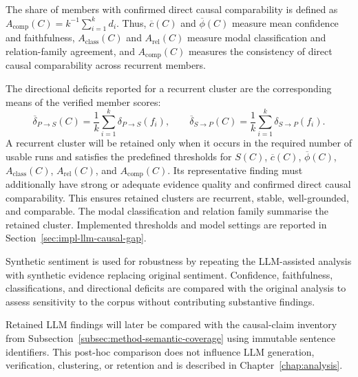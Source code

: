 The share of members with confirmed direct causal comparability is defined as
$A_{\mathrm{comp}}(C)=k^{-1}\sum_{i=1}^{k}d_i$. Thus, $\overline{c}(C)$ and
$\overline{\phi}(C)$ measure mean confidence and faithfulness,
$A_{\mathrm{class}}(C)$ and $A_{\mathrm{rel}}(C)$ measure modal classification and
relation-family agreement, and $A_{\mathrm{comp}}(C)$ measures the consistency of
direct causal comparability across recurrent members.

The directional deficits reported for a recurrent cluster are the corresponding means
of the verified member scores:
\begin{equation}
\overline{\delta}_{P\rightarrow S}(C)
=
\frac{1}{k}
\sum_{i=1}^{k}\delta_{P\rightarrow S}(f_i),
\qquad
\overline{\delta}_{S\rightarrow P}(C)
=
\frac{1}{k}
\sum_{i=1}^{k}\delta_{S\rightarrow P}(f_i).
\label{eq:method-agent-deficits}
\end{equation}
A recurrent cluster will be retained only when it occurs in the required number of
usable runs and satisfies the predefined thresholds for $S(C)$,
$\overline{c}(C)$, $\overline{\phi}(C)$,
$A_{\mathrm{class}}(C)$, $A_{\mathrm{rel}}(C)$, and
$A_{\mathrm{comp}}(C)$. Its representative finding must additionally have strong or
adequate evidence quality and confirmed direct causal comparability. This ensures
retained clusters are recurrent, stable, well-grounded, and comparable. The modal
classification and relation family summarise the retained cluster. Implemented
thresholds and model settings are reported in
Section~\ref{sec:impl-llm-causal-gap}.

Synthetic sentiment is used for robustness by repeating
the LLM-assisted analysis with synthetic evidence replacing original sentiment.
Confidence, faithfulness, classifications, and directional deficits are compared
with the original analysis to assess sensitivity to the corpus without contributing
substantive findings.

Retained LLM findings will later be compared with the causal-claim inventory from
Subsection~\ref{subsec:method-semantic-coverage} using immutable sentence
identifiers. This post-hoc comparison does not influence LLM generation,
verification, clustering, or retention and is described in
Chapter~\ref{chap:analysis}.


